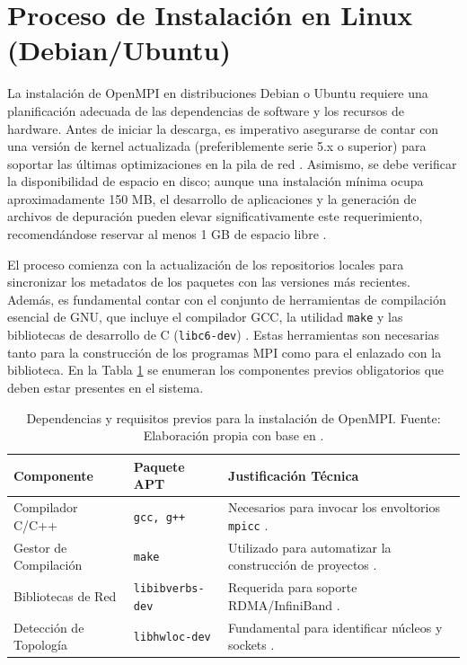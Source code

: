 \section{Proceso de Instalación en Linux (Debian/Ubuntu)}

La instalación de OpenMPI en distribuciones Debian o Ubuntu requiere una planificación adecuada de las dependencias de software y los recursos de hardware. Antes de iniciar la descarga, es imperativo asegurarse de contar con una versión de kernel actualizada (preferiblemente serie 5.x o superior) para soportar las últimas optimizaciones en la pila de red \cite{ref14_cristian_KernelMinimalReq}. Asimismo, se debe verificar la disponibilidad de espacio en disco; aunque una instalación mínima ocupa aproximadamente 150 MB, el desarrollo de aplicaciones y la generación de archivos de depuración pueden elevar significativamente este requerimiento, recomendándose reservar al menos 1 GB de espacio libre \cite{ref12_cristian_Ubuntu_Packages}.

El proceso comienza con la actualización de los repositorios locales para sincronizar los metadatos de los paquetes con las versiones más recientes. Además, es fundamental contar con el conjunto de herramientas de compilación esencial de GNU, que incluye el compilador GCC, la utilidad \texttt{make} y las bibliotecas de desarrollo de C (\texttt{libc6-dev}) \cite{ref13_cristian_Hokiegeek2024}. Estas herramientas son necesarias tanto para la construcción de los programas MPI como para el enlazado con la biblioteca. En la Tabla \ref{tab:install_requirements} se enumeran los componentes previos obligatorios que deben estar presentes en el sistema.

\begin{table}[H]
    \centering
    \caption{Dependencias y requisitos previos para la instalación de OpenMPI. Fuente: Elaboración propia con base en \cite{ref12_cristian_Ubuntu_Packages, ref13_cristian_Hokiegeek2024, ref14_cristian_KernelMinimalReq}.}
    \label{tab:install_requirements}
    \begin{tabular}{|l|l|p{7cm}|}
    \hline
    \textbf{Componente} & \textbf{Paquete APT} & \textbf{Justificación Técnica} \\ \hline
    Compilador C/C++ & \texttt{gcc, g++} & Necesarios para invocar los envoltorios \texttt{mpicc} \cite{ref13_cristian_Hokiegeek2024}. \\ \hline
    Gestor de Compilación & \texttt{make} & Utilizado para automatizar la construcción de proyectos \cite{ref14_cristian_KernelMinimalReq}. \\ \hline
    Bibliotecas de Red & \texttt{libibverbs-dev} & Requerida para soporte RDMA/InfiniBand \cite{ref12_cristian_Ubuntu_Packages}. \\ \hline
    Detección de Topología & \texttt{libhwloc-dev} & Fundamental para identificar núcleos y sockets \cite{ref12_cristian_Ubuntu_Packages}. \\ \hline
    \end{tabular}
\end{table}

